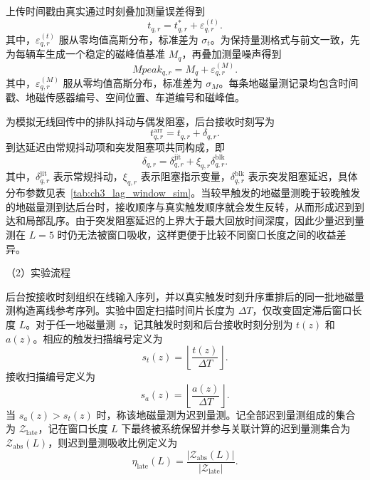 \documentclass{xdupgthesis}
\begin{document}
上传时间戳由真实通过时刻叠加测量误差得到
\begin{equation}
	t_{q,r}
	=
	t_{q,r}^{\ast}+\varepsilon_{q,r}^{(t)}.
\end{equation}
其中，$\varepsilon_{q,r}^{(t)}$ 服从零均值高斯分布，标准差为 $\sigma_t$。为保持量测格式与前文一致，先为每辆车生成一个稳定的磁峰值基准 $M_q$，再叠加测量噪声得到
\begin{equation}
	Mpeak_{q,r}
	=
	M_q+\varepsilon_{q,r}^{(M)}.
\end{equation}
其中，$\varepsilon_{q,r}^{(M)}$ 服从零均值高斯分布，标准差为 $\sigma_M$。每条地磁量测记录均包含时间戳、地磁传感器编号、空间位置、车道编号和磁峰值。

为模拟无线回传中的排队抖动与偶发阻塞，后台接收时刻写为
\begin{equation}
	t_{q,r}^{\mathrm{arr}}
	=
	t_{q,r}+\delta_{q,r}.
\end{equation}
到达延迟由常规抖动项和突发阻塞项共同构成，即
\begin{equation}
	\delta_{q,r}
	=
	\delta_{q,r}^{\mathrm{jit}}+\xi_{q,r}\delta_{q,r}^{\mathrm{blk}}.
\end{equation}
其中，$\delta_{q,r}^{\mathrm{jit}}$ 表示常规抖动，$\xi_{q,r}$ 表示阻塞指示变量，$\delta_{q,r}^{\mathrm{blk}}$ 表示突发阻塞延迟，具体分布参数见表~\ref{tab:ch3_lag_window_sim}。当较早触发的地磁量测晚于较晚触发的地磁量测到达后台时，接收顺序与真实触发顺序就会发生反转，从而形成迟到到达和局部乱序。由于突发阻塞延迟的上界大于最大回放时间深度，因此少量迟到量测在 $L=5$ 时仍无法被窗口吸收，这样更便于比较不同窗口长度之间的收益差异。

\noindent （2）实验流程

后台按接收时刻组织在线输入序列，并以真实触发时刻升序重排后的同一批地磁量测构造离线参考序列。实验中固定扫描时间片长度为 $\Delta T$，仅改变固定滞后窗口长度 $L$。对于任一地磁量测 $z$，记其触发时刻和后台接收时刻分别为 $t(z)$ 和 $a(z)$。相应的触发扫描编号定义为
\begin{equation}
	s_t(z)
	=
	\left\lfloor\frac{t(z)}{\Delta T}\right\rfloor.
\end{equation}
接收扫描编号定义为
\begin{equation}
	s_a(z)
	=
	\left\lfloor\frac{a(z)}{\Delta T}\right\rfloor.
\end{equation}
当 $s_a(z)>s_t(z)$ 时，称该地磁量测为迟到量测。记全部迟到量测组成的集合为 $\mathcal Z_{\mathrm{late}}$，记在窗口长度 $L$ 下最终被系统保留并参与关联计算的迟到量测集合为 $\mathcal Z_{\mathrm{abs}}(L)$，则迟到量测吸收比例定义为
\begin{equation}
	\eta_{\mathrm{late}}(L)
	=
	\frac{\left|\mathcal Z_{\mathrm{abs}}(L)\right|}{\left|\mathcal Z_{\mathrm{late}}\right|}.
\end{equation}
\end{document}
